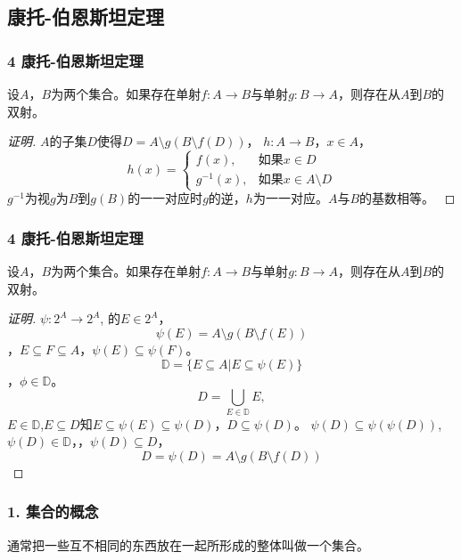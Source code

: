 \documentclass{beamer}
\begin{document}
\begin{CJK*}{UTF8}{gbsn}
\section{康托-伯恩斯坦定理}
\begin{frame}
  \frametitle{4 康托-伯恩斯坦定理}
  \begin{Thm}[康托-伯恩斯坦]
    设$A$，$B$为两个集合。如果存在单射$f:A\to B$与单射$g:B\to A$，则存在从$A$到$B$的双射。
  \end{Thm}\pause
  \begin{proof}[证明]{\small
    $A$的子集$D$使得$D=A\setminus g(B\setminus f(D))$，
    $h:A\to B$，$x\in A$，\pause
    \[h(x)=\begin{cases}
        f(x),&\text{如果}x\in D\\
        g^{-1}(x),&\text{如果}x\in A\setminus D
      \end{cases}
    \]
    $g^{-1}$为视$g$为$B$到$g(B)$的一一对应时$g$的逆，$h$为一一对应。$A$与$B$的基数相等。
    }
  \end{proof}
\end{frame}

\begin{frame}
  \frametitle{4 康托-伯恩斯坦定理}
  \begin{Thm}[康托-伯恩斯坦]
    设$A$，$B$为两个集合。如果存在单射$f:A\to B$与单射$g:B\to A$，则存在从$A$到$B$的双射。
  \end{Thm}\pause
  \begin{proof}[证明]{\small
    $\psi:2^A\to 2^A$,
    的$E\in 2^A$，\pause\[\psi(E)=A\setminus g(B\setminus f(E))\]，$E\subseteq F\subseteq A$，$\psi(E)\subseteq \psi(F)$。
    \[\mathbb{D}=\{E\subseteq A|E\subseteq \psi(E)\}\]，$\phi\in \mathbb{D}$。
    \[D=\bigcup_{E\in \mathbb{D}}E,\]
    $E\in \mathbb{D}$,$E\subseteq D$知$E\subseteq \psi(E) \subseteq \psi(D)$，$D\subseteq \psi(D)$。
    $\psi(D)\subseteq \psi(\psi(D))$,$\psi(D)\in \mathbb{D}$，，\pause$\psi(D)\subseteq D$，
    \pause\[D=\psi(D)=A\setminus g(B\setminus f(D))\]}
  \end{proof}
\end{frame}
\begin{frame}[t]
  \frametitle{1. 集合的概念}
  \begin{Defofset}
    通常把一些互不相同的东西放在一起所形成的整体叫做一个\alert{集合}。
  \end{Defofset}
\end{frame}


\end{CJK*}
\end{document}
